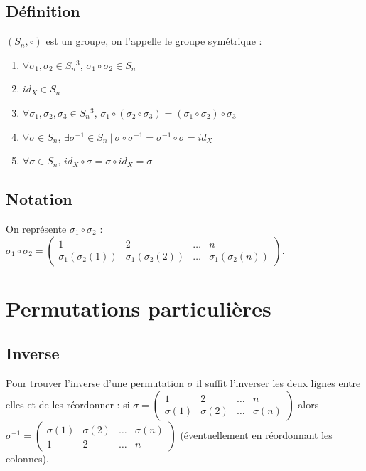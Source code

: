 \documentclass[a4paper,10pt]{book} %
\newcommand{\tq}{~|~}
\begin{document}
\subsection{Définition}
$(S_n,\circ)$ est un groupe, on l'appelle le groupe symétrique :
\begin{enumerate}
\item $\forall \sigma_1,\sigma_2\in S_n{}^3$, $\sigma_1\circ \sigma_2\in S_n$
\item $id_X\in S_n$
\item $\forall \sigma_1,\sigma_2,\sigma_3\in S_n{}^3$, $\sigma_1\circ(\sigma_2\circ \sigma_3)=(\sigma_1\circ \sigma_2)\circ \sigma_3$
\item $\forall \sigma\in S_n$, $\exists \sigma^{-1}\in S_n \tq \sigma\circ \sigma^{-1}=\sigma^{-1}\circ \sigma=id_X$
\item $\forall \sigma \in S_n$, $id_X\circ \sigma=\sigma\circ id_X=\sigma$
\end{enumerate}

\subsection{Notation}
On représente $\sigma_1\circ \sigma_2$ : $\sigma_1\circ \sigma_2=\begin{pmatrix}
1&2&\dots&n\\
\sigma_1(\sigma_2(1)) & \sigma_1(\sigma_2(2)) & \dots & \sigma_1(\sigma_2(n))
\end{pmatrix}$.

\section{Permutations particulières}
\subsection{Inverse}
Pour trouver l'inverse d'une permutation $\sigma$ il suffit l'inverser les deux lignes entre elles et de les réordonner :
si $\sigma=\begin{pmatrix}
1 & 2 & \dots & n \\
\sigma(1) & \sigma(2) & \dots & \sigma(n)
\end{pmatrix}$ alors $\sigma^{-1}=\begin{pmatrix}
\sigma(1) & \sigma(2) & \dots & \sigma(n)\\
1 & 2 & \dots & n
\end{pmatrix}$ (éventuellement en réordonnant les colonnes).
\end{document}
